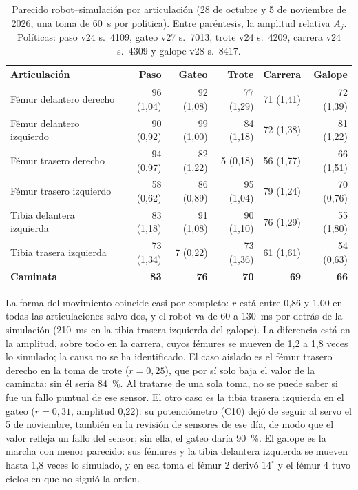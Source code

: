 \begin{table}[H]
\centering
\caption{Parecido robot--simulación por articulación (28 de octubre y 5 de noviembre de 2026, una toma de 60~s por política). Entre paréntesis, la amplitud relativa $A_j$. Políticas: paso v24 s.~4109, gateo v27 s.~7013, trote v24 s.~4209, carrera v24 s.~4309 y galope v28 s.~8417.}
\label{tab:parecido}
\footnotesize
\setlength{\tabcolsep}{4pt}
\begin{tabular}{lrrrrr}
\toprule
Articulación & Paso & Gateo & Trote & Carrera & Galope \\
\midrule
Fémur delantero derecho & 96 (1,04) & 92 (1,08) & 77 (1,29) & 71 (1,41) & 72 (1,39) \\
Fémur delantero izquierdo & 90 (0,92) & 99 (1,00) & 84 (1,18) & 72 (1,38) & 81 (1,22) \\
Fémur trasero derecho & 94 (0,97) & 82 (1,22) & 5 (0,18) & 56 (1,77) & 66 (1,51) \\
Fémur trasero izquierdo & 58 (0,62) & 86 (0,89) & 95 (1,04) & 79 (1,24) & 70 (0,76) \\
Tibia delantera izquierda & 83 (1,18) & 91 (1,08) & 90 (1,10) & 76 (1,29) & 55 (1,80) \\
Tibia trasera izquierda & 73 (1,34) & 7 (0,22) & 73 (1,36) & 61 (1,61) & 54 (0,63) \\
\midrule
\textbf{Caminata} & \textbf{83} & \textbf{76} & \textbf{70} & \textbf{69} & \textbf{66} \\
\bottomrule
\bottomrule
\end{tabular}
\end{table}

La forma del movimiento coincide casi por completo: $r$ está entre 0,86 y 1,00 en
todas las articulaciones salvo dos, y el robot va de 60 a 130~ms por detrás de la
simulación (210~ms en la tibia trasera izquierda del galope). La diferencia está en la amplitud, sobre todo en la carrera, cuyos
fémures se mueven de 1,2 a 1,8 veces lo simulado; la causa no se ha identificado. El
caso aislado es el fémur trasero derecho en la toma de trote ($r=0{,}25$), que por
sí solo baja el valor de la caminata: sin él sería 84~\%. Al tratarse de una sola
toma, no se puede saber si fue un fallo puntual de ese sensor. El otro caso es la
tibia trasera izquierda en el gateo ($r=0{,}31$, amplitud 0,22): su potenciómetro (C10)
dejó de seguir al servo el 5 de noviembre, también en la revisión de sensores de ese
día, de modo que el valor refleja un fallo del sensor; sin ella, el gateo daría 90~\%.
El galope es la marcha con menor parecido: sus fémures y la tibia delantera izquierda se
mueven hasta 1,8 veces lo simulado, y en esa toma el fémur 2 derivó $14^\circ$ y el
fémur 4 tuvo ciclos en que no siguió la orden.

